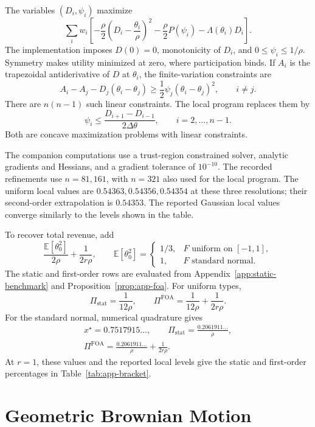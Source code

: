 \documentclass[12pt]{article}
\newcommand{\E}{\mathbb{E}}
\begin{document}
The variables \((D_i,\psi_i)\) maximize
\[
  \sum_iw_i\left[
    -\frac{\rho}{2}\left(D_i-\frac{\theta_i}{\rho}\right)^2
    -\frac{\rho}{2}P(\psi_i)-\Lambda(\theta_i)D_i
  \right].
\]
The implementation imposes \(D(0)=0\), monotonicity of \(D_i\), and
\(0\leq\psi_i\leq1/\rho\). Symmetry makes utility minimized at zero,
where participation binds. If \(A_i\) is the trapezoidal
antiderivative of \(D\) at \(\theta_i\), the finite-variation
constraints are
\[
  A_i-A_j-D_j(\theta_i-\theta_j)
      \geq\frac12\psi_j(\theta_i-\theta_j)^2,
       \qquad i\ne j.
\]
There are \(n(n-1)\) such linear constraints. The local program replaces
them by
\[
  \psi_i\leq\frac{D_{i+1}-D_{i-1}}{2\Delta\theta},
       \qquad i=2,\ldots,n-1.
\]
Both are concave maximization problems with linear constraints.

The companion computations use a trust-region constrained solver,
analytic gradients and Hessians, and a gradient tolerance of
\(10^{-10}\). The recorded refinements use \(n=81,161\), with
\(n=321\) also used for the local program. The uniform local values
are \(0.54363,0.54356,0.54354\) at these three resolutions; their
second-order extrapolation is \(0.54353\). The reported Gaussian
local values converge similarly to the levels shown in the table.

To recover total revenue, add
\[
  \frac{\E[\theta_0^2]}{2\rho}+\frac1{2r\rho},
  \qquad
  \E[\theta_0^2]=
  \begin{cases}
    1/3,&F\text{ uniform on }[-1,1],\\
    1,&F\text{ standard normal}.
  \end{cases}
\]
The static and first-order rows are evaluated from
Appendix~\ref{app:static-benchmark} and
Proposition~\ref{prop:app-foa}. For uniform types,
\[
  \Pi_{\mathrm{stat}}=\frac1{12\rho},
  \qquad
  \Pi^{\mathrm{FOA}}=\frac1{12\rho}+\frac1{2r\rho}.
\]
For the standard normal, numerical quadrature gives
\[
\begin{gathered}
  x^\star=0.7517915\ldots,\qquad
  \Pi_{\mathrm{stat}}=\frac{0.2061911\ldots}{\rho},\\
  \Pi^{\mathrm{FOA}}
     =\frac{0.2061911\ldots}{\rho}+\frac1{2r\rho}.
\end{gathered}
\]
At \(r=1\), these values and the reported local levels give the
static and first-order percentages in Table~\ref{tab:app-bracket}.

\section{Geometric Brownian Motion}
\label{app:gbm}
\end{document}
